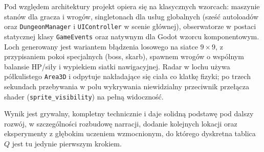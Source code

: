 Pod względem architektury projekt opiera się na klasycznych wzorcach: maszynie stanów dla gracza i wrogów, singletonach dla usług globalnych (sześć autoloadów oraz \texttt{DungeonManager} i \texttt{UIController} w scenie głównej), obserwatorze w postaci statycznej klasy \texttt{GameEvents} oraz natywnym dla Godot wzorcu komponentowym. Loch generowany jest wariantem błądzenia losowego na siatce $9 \times 9$, z przypisaniem pokoi specjalnych (boss, skarb), spawnem wrogów o wspólnym balansie HP/siły i wypiekiem siatki nawigacyjnej. Radar w lochu używa półkulistego \texttt{Area3D} i odpytuje nakładające się ciała co klatkę fizyki; po trzech sekundach przebywania w polu wykrywania niewidzialny przeciwnik przełącza shader (\texttt{sprite\_visibility}) na pełną widoczność.

Wynik jest grywalny, kompletny technicznie i daje solidną podstawę pod dalszy rozwój, w szczególności rozbudowę narracji, dodanie kolejnych lokacji oraz eksperymenty z głębokim uczeniem wzmocnionym, do którego dyskretna tablica $Q$ jest tu jedynie pierwszym krokiem.

\cleardoublepage
